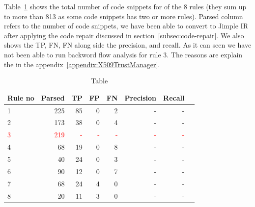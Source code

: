 Table~\ref{tab:results} shows the total number of code snippets for of the 8 rules (they sum up to more than 813 as some code snippets has two or more rules). Parsed column refers to the number of code snippets, we have been able to convert to Jimple IR after applying the code repair discussed in section~\ref{subsec:code-repair}. We also shows the TP, FN, FN along side the precision, and recall.
As it can seen we have not been able to run backword flow analysis for rule 3. The reasons are explain the in the appendix~\ref{appendix:X509TrustManager}.


\begin{table}[ht]
\begin{tabular}{|l|r|r|r|r|r|r|r|}
\toprule
Rule no & Parsed & TP & FP & FN & Precision & Recall \\ \midrule
1 & 225 & 85 & 0 & 2 & - & - \\
2 & 173 & 38 & 0 & 4 & - & - \\
\textcolor{red}{3} & \textcolor{red}{219} & \textcolor{red}{-} & \textcolor{red}{-} & \textcolor{red}{-} & \textcolor{red}{-} & \textcolor{red}{-}\\
4 & 68 & 19 &  0 & 8& - & - \\
5 & 40 & 24 & 0 & 3& - & - \\
6 & 90 & 12 & 0 & 7 & - & -\\ \midrule
7 & 68 & 24 & 4& 0 & - & - \\
8 & 20 & 11 & 3& 0 & - & -\\        
\bottomrule
\end{tabular}
\caption{Table}
\label{tab:results}
\end{table}